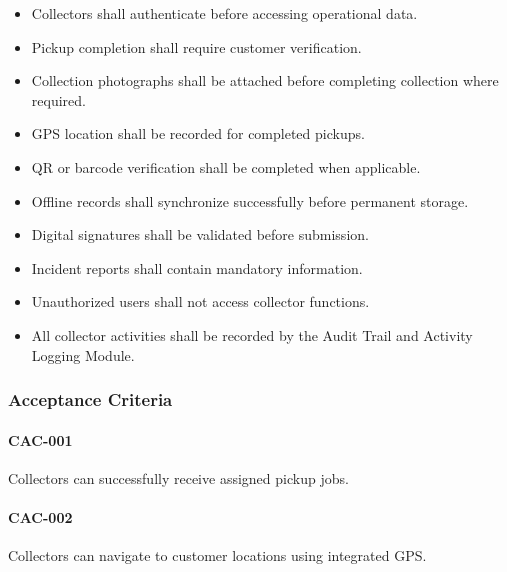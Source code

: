 \begin{itemize}

\item Collectors shall authenticate before accessing operational data.

\item Pickup completion shall require customer verification.

\item Collection photographs shall be attached before completing
collection where required.

\item GPS location shall be recorded for completed pickups.

\item QR or barcode verification shall be completed when applicable.

\item Offline records shall synchronize successfully before permanent
storage.

\item Digital signatures shall be validated before submission.

\item Incident reports shall contain mandatory information.

\item Unauthorized users shall not access collector functions.

\item All collector activities shall be recorded by the Audit Trail and
Activity Logging Module.

\end{itemize}


\subsubsection*{Acceptance Criteria}

\paragraph{CAC-001}

Collectors can successfully receive assigned pickup jobs.

\paragraph{CAC-002}

Collectors can navigate to customer locations using integrated GPS.


